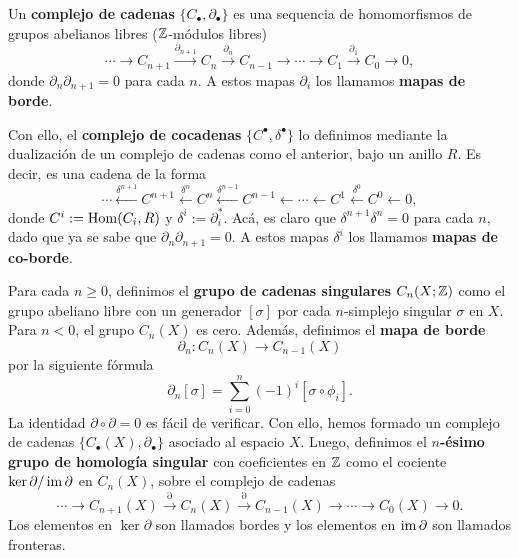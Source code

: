 \begin{definition}
	Un \textbf{complejo de cadenas} $\{ C_{\bullet}, \partial_{\bullet} \}$ es una sequencia de homomorfismos de grupos abelianos libres ($\mathbb{Z}$-módulos libres)
	\[ \cdots \rightarrow C_{n+1} \xrightarrow{\partial_{n+1}} C_{n} \xrightarrow{\partial_{n}} C_{n-1} \rightarrow \cdots \rightarrow C_{1} \xrightarrow{\partial_{1}} C_{0} \rightarrow 0, \]
	donde $\partial_{n} \partial_{n+1} = 0$ para cada $n$. A estos mapas $\partial_{i}$ los llamamos \textbf{mapas de borde}. \par
	Con ello, el \textbf{complejo de cocadenas} $\{ C^{\bullet}, \delta^{\bullet} \}$ lo definimos mediante la dualización de un complejo de cadenas como el anterior, bajo un anillo $R$. Es decir, es una cadena de la forma
	\[ \cdots \xleftarrow{\delta^{n+1}} C^{n+1} \xleftarrow{\delta^{n}} C^{n} \xleftarrow{\delta^{n-1}} C^{n-1} \leftarrow \cdots \leftarrow C^{1} \xleftarrow{\delta^{0}} C^{0} \leftarrow 0, \]
	donde $C^{i} := \operatorname{Hom}(C_{i}, R)$ y $\delta^{i} := \partial_{i}^{*}$. Acá, es claro que $\delta^{n+1} \delta^{n} = 0$ para cada $n$, dado que ya se sabe que $\partial_{n} \partial_{n+1} = 0$. A estos mapas $\delta^{i}$ los llamamos \textbf{mapas de co-borde}.
\end{definition}

\begin{definition}
	Para cada $n \geq 0$, definimos el \textbf{grupo de cadenas singulares} $C_{n}(X; \mathbb{Z})$ como el grupo abeliano libre con un generador $[\sigma]$ por cada $n$-simplejo singular $\sigma$ en $X$. Para $n < 0$, el grupo $C_{n}(X)$ es cero. Además, definimos el \textbf{mapa de borde}
	\[ \partial_{n} \colon C_{n}(X) \to C_{n-1}(X) \]
	por la siguiente fórmula
	\[ \partial_{n}[\sigma] = \sum_{i=0}^{n} (-1)^{i}[\sigma \circ \phi_{i}]. \]
	La identidad $\partial \circ \partial = 0$ es fácil de verificar. Con ello, hemos formado un complejo de cadenas $\{ C_{\bullet}(X), \partial_{\bullet} \}$ asociado al espacio $X$.
	Luego, definimos el \textbf{$n$-ésimo grupo de homología singular} con coeficientes en $\mathbb{Z}$ como el cociente $\ker \partial \slash \operatorname{im} \partial$ en $C_{n}(X)$, sobre el complejo de cadenas
	\[ \cdots \to C_{n+1}(X) \xrightarrow{\partial} C_{n}(X) \xrightarrow{\partial} C_{n-1}(X) \to \cdots \to C_{0}(X) \to 0. \]
	Los elementos en $\ker \partial$ son llamados bordes y los elementos en $\operatorname{im} \partial$ son llamados fronteras.
\end{definition}

